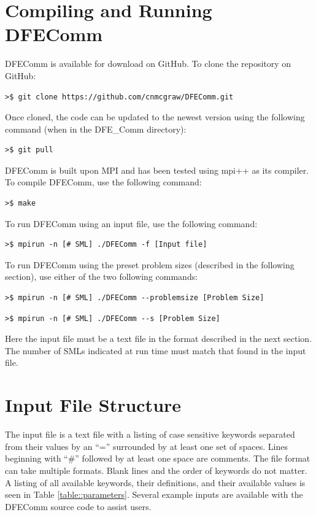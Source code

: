\documentclass{article}
\begin{document}
\section{Compiling and Running DFEComm}
DFEComm is available for download on GitHub. To clone the repository on GitHub:
\begin{verbatim}
>$ git clone https://github.com/cnmcgraw/DFEComm.git
\end{verbatim}
Once cloned, the code can be updated to the newest version using the following command (when in the DFE\_Comm directory):
\begin{verbatim}
>$ git pull
\end{verbatim}
 DFEComm is built upon MPI and has been tested using mpi++ as its compiler. To compile DFEComm, use the following command:
\begin{verbatim}
>$ make
\end{verbatim}
To run DFEComm using an input file, use the following command:
\begin{verbatim}
>$ mpirun -n [# SML] ./DFEComm -f [Input file]
\end{verbatim}
To run DFEComm using the preset problem sizes (described in the following section), use either of the two following commands:
\begin{verbatim}
>$ mpirun -n [# SML] ./DFEComm --problemsize [Problem Size]
\end{verbatim}
\begin{verbatim}
>$ mpirun -n [# SML] ./DFEComm --s [Problem Size]
\end{verbatim}
Here the input file must be a text file in the format described in the next section. The number of SMLs indicated at run time must match that found in the input file.

\section{Input File Structure}
The input file is a text file with a listing of case sensitive keywords separated from their values by an ``='' surrounded by at least one set of spaces. Lines beginning with ``\#'' followed by at least one space are comments. The file format can take multiple formats. Blank lines and the order of keywords do not matter. A listing of all available keywords, their definitions, and their available values is seen in Table \ref{table::parameters}.  Several example inputs are available with the DFEComm source code to assist users. \\
\end{document}
